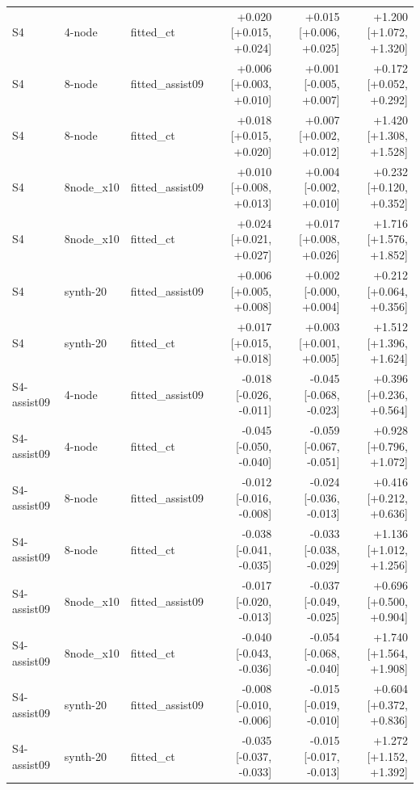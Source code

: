 \begin{table}[htbp]
\begin{tabular}{lllrrr}
S4 & 4-node & fitted\_ct & +0.020 [+0.015, +0.024] & +0.015 [+0.006, +0.025] & +1.200 [+1.072, +1.320] \\
S4 & 8-node & fitted\_assist09 & +0.006 [+0.003, +0.010] & +0.001 [-0.005, +0.007] & +0.172 [+0.052, +0.292] \\
S4 & 8-node & fitted\_ct & +0.018 [+0.015, +0.020] & +0.007 [+0.002, +0.012] & +1.420 [+1.308, +1.528] \\
S4 & 8node\_x10 & fitted\_assist09 & +0.010 [+0.008, +0.013] & +0.004 [-0.002, +0.010] & +0.232 [+0.120, +0.352] \\
S4 & 8node\_x10 & fitted\_ct & +0.024 [+0.021, +0.027] & +0.017 [+0.008, +0.026] & +1.716 [+1.576, +1.852] \\
S4 & synth-20 & fitted\_assist09 & +0.006 [+0.005, +0.008] & +0.002 [-0.000, +0.004] & +0.212 [+0.064, +0.356] \\
S4 & synth-20 & fitted\_ct & +0.017 [+0.015, +0.018] & +0.003 [+0.001, +0.005] & +1.512 [+1.396, +1.624] \\
S4-assist09 & 4-node & fitted\_assist09 & -0.018 [-0.026, -0.011] & -0.045 [-0.068, -0.023] & +0.396 [+0.236, +0.564] \\
S4-assist09 & 4-node & fitted\_ct & -0.045 [-0.050, -0.040] & -0.059 [-0.067, -0.051] & +0.928 [+0.796, +1.072] \\
S4-assist09 & 8-node & fitted\_assist09 & -0.012 [-0.016, -0.008] & -0.024 [-0.036, -0.013] & +0.416 [+0.212, +0.636] \\
S4-assist09 & 8-node & fitted\_ct & -0.038 [-0.041, -0.035] & -0.033 [-0.038, -0.029] & +1.136 [+1.012, +1.256] \\
S4-assist09 & 8node\_x10 & fitted\_assist09 & -0.017 [-0.020, -0.013] & -0.037 [-0.049, -0.025] & +0.696 [+0.500, +0.904] \\
S4-assist09 & 8node\_x10 & fitted\_ct & -0.040 [-0.043, -0.036] & -0.054 [-0.068, -0.040] & +1.740 [+1.564, +1.908] \\
S4-assist09 & synth-20 & fitted\_assist09 & -0.008 [-0.010, -0.006] & -0.015 [-0.019, -0.010] & +0.604 [+0.372, +0.836] \\
S4-assist09 & synth-20 & fitted\_ct & -0.035 [-0.037, -0.033] & -0.015 [-0.017, -0.013] & +1.272 [+1.152, +1.392] \\
\bottomrule
\end{tabular}
\end{table}
